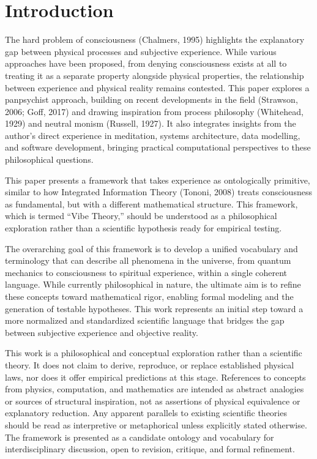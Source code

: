 \section{Introduction}

The hard problem of consciousness (Chalmers, 1995) highlights the explanatory gap between physical processes and subjective experience. While various approaches have been proposed, from denying consciousness exists at all to treating it as a separate property alongside physical properties, the relationship between experience and physical reality remains contested. This paper explores a panpsychist approach, building on recent developments in the field (Strawson, 2006; Goff, 2017) and drawing inspiration from process philosophy (Whitehead, 1929) and neutral monism (Russell, 1927). It also integrates insights from the author's direct experience in meditation, systems architecture, data modelling, and software development, bringing practical computational perspectives to these philosophical questions.

This paper presents a framework that takes experience as ontologically primitive, similar to how Integrated Information Theory (Tononi, 2008) treats consciousness as fundamental, but with a different mathematical structure. This framework, which is termed ``Vibe Theory,'' should be understood as a philosophical exploration rather than a scientific hypothesis ready for empirical testing.

The overarching goal of this framework is to develop a unified vocabulary and terminology that can describe all phenomena in the universe, from quantum mechanics to consciousness to spiritual experience, within a single coherent language. While currently philosophical in nature, the ultimate aim is to refine these concepts toward mathematical rigor, enabling formal modeling and the generation of testable hypotheses. This work represents an initial step toward a more normalized and standardized scientific language that bridges the gap between subjective experience and objective reality.

This work is a philosophical and conceptual exploration rather than a scientific theory. It does not claim to derive, reproduce, or replace established physical laws, nor does it offer empirical predictions at this stage. References to concepts from physics, computation, and mathematics are intended as abstract analogies or sources of structural inspiration, not as assertions of physical equivalence or explanatory reduction. Any apparent parallels to existing scientific theories should be read as interpretive or metaphorical unless explicitly stated otherwise. The framework is presented as a candidate ontology and vocabulary for interdisciplinary discussion, open to revision, critique, and formal refinement.
